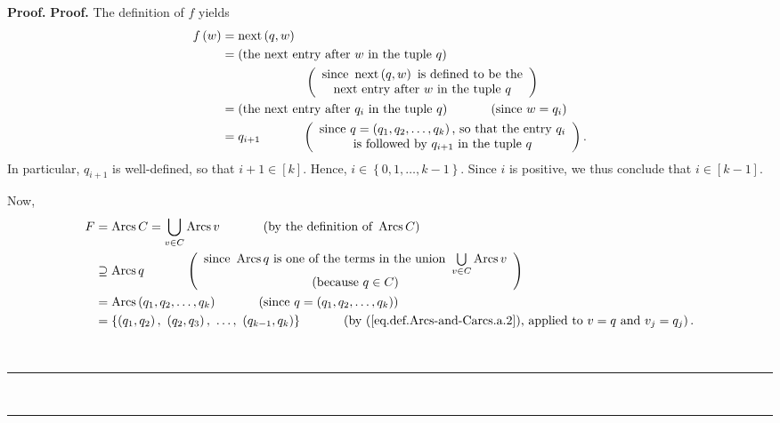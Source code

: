 \documentclass[numbers=enddot,12pt,final,onecolumn,notitlepage]{scrartcl}%
\numberwithin{exer}{section}
\theoremstyle{definition}
\newenvironment{proof}[1][Proof]{\noindent\textbf{#1.} }{\ \rule{0.5em}{0.5em}}
\let\cupnonlimits\bigcup
\renewcommand{\bigcup}{\cupnonlimits\limits}
\newenvironment{verlong}{}{}
\begin{document}
\begin{verlong}
\begin{proof}
\begin{proof}
The definition of $f$ yields
\begin{align*}
f\left(  w\right)   &  =\operatorname*{next}\left(  q,w\right) \\
&  =\left(  \text{the next entry after }w\text{ in the tuple }q\right) \\
&  \ \ \ \ \ \ \ \ \ \ \ \ \ \ \ \ \ \ \ \ \left(
\begin{array}
[c]{c}%
\text{since }\operatorname*{next}\left(  q,w\right)  \text{ is defined to be
the}\\
\text{next entry after }w\text{ in the tuple }q
\end{array}
\right) \\
&  =\left(  \text{the next entry after }q_{i}\text{ in the tuple }q\right)
\ \ \ \ \ \ \ \ \ \ \left(  \text{since }w=q_{i}\right) \\
&  =q_{i+1}\ \ \ \ \ \ \ \ \ \ \left(
\begin{array}
[c]{c}%
\text{since }q=\left(  q_{1},q_{2},\ldots,q_{k}\right)  \text{, so that the
entry }q_{i}\\
\text{is followed by }q_{i+1}\text{ in the tuple }q
\end{array}
\right)  .
\end{align*}
In particular, $q_{i+1}$ is well-defined, so that $i+1\in\left[  k\right]  $.
Hence, $i\in\left\{  0,1,\ldots,k-1\right\}  $. Since $i$ is positive, we thus
conclude that $i\in\left[  k-1\right]  $.

Now,
\begin{align*}
F  &  =\operatorname*{Arcs}C=\bigcup_{v\in C}\operatorname*{Arcs}%
v\ \ \ \ \ \ \ \ \ \ \left(  \text{by the definition of }\operatorname*{Arcs}%
C\right) \\
&  \supseteq\operatorname*{Arcs}q\ \ \ \ \ \ \ \ \ \ \left(
\begin{array}
[c]{c}%
\text{since }\operatorname*{Arcs}q\text{ is one of the terms in the union
}\bigcup_{v\in C}\operatorname*{Arcs}v\\
\text{(because }q\in C\text{)}%
\end{array}
\right) \\
&  =\operatorname*{Arcs}\left(  q_{1},q_{2},\ldots,q_{k}\right)
\ \ \ \ \ \ \ \ \ \ \left(  \text{since }q=\left(  q_{1},q_{2},\ldots
,q_{k}\right)  \right) \\
&  =\left\{  \left(  q_{1},q_{2}\right)  ,\ \left(  q_{2},q_{3}\right)
,\ \ldots,\ \left(  q_{k-1},q_{k}\right)  \right\}
\ \ \ \ \ \ \ \ \ \ \left(  \text{by (\ref{eq.def.Arcs-and-Carcs.a.2}),
applied to }v=q\text{ and }v_{j}=q_{j}\right)  .
\end{align*}



\end{proof}
\end{proof}
\end{verlong}
\end{document}
